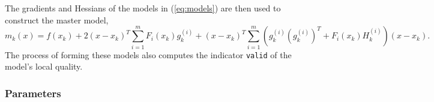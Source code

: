 The gradients and Hessians of the models in (\ref{eq:models}) are then
used to construct the master model, 
\begin{equation}
m_k(x) = f(x_k) + 
2(x-x_k)^T \sum_{i=1}^{m} F_i(x_k) g_k^{(i)} +
(x-x_k)^T \sum_{i=1}^{m}
\left( g_k^{(i)} \left(g_k^{(i)}\right)^T +  F_i(x_k)
H_k^{(i)}\right) (x-x_k).
 \label{eq:newton2}
\end{equation}
The process of forming these models also computes the indicator
\texttt{valid} of the model's local quality.


\subsubsection{Parameters}

